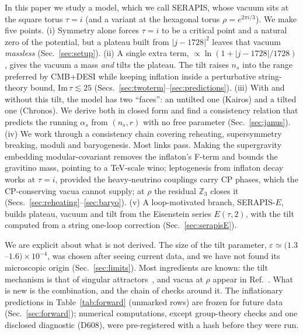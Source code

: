 \documentclass[aps,prd,twocolumn,superscriptaddress,nofootinbib,floatfix]{revtex4-2}
\begin{document}
In this paper we study a model, which we call SERAPIS, whose vacuum sits at the square torus $\tau = i$ (and a variant at the hexagonal torus $\rho = e^{2\pi i/3}$). We make five points.
(i) Symmetry alone forces $\tau = i$ to be a critical point and a natural zero of the potential, but a plateau built from $|j-1728|^2$ leaves that vacuum \emph{massless} (Sec.~\ref{sec:setup}).
(ii) A single extra term, $\propto \ln(1+|j-1728|/1728)$, gives the vacuum a mass \emph{and} tilts the plateau. The tilt raises $n_s$ into the range preferred by CMB+DESI while keeping inflation inside a perturbative string-theory bound, $\mathrm{Im}\,\tau \lesssim 25$ (Secs.~\ref{sec:twoterm}--\ref{sec:predictions}).
(iii) With and without this tilt, the model has two ``faces'': an untilted one (Kairos) and a tilted one (Chronos). We derive both in closed form and find a consistency relation that predicts the running $\alpha_s$ from $(n_s, r)$ with no free parameter (Sec.~\ref{sec:janus}).
(iv) We work through a consistency chain covering reheating, supersymmetry breaking, moduli and baryogenesis. Most links pass. Making the supergravity embedding modular-covariant removes the inflaton's F-term and bounds the gravitino mass, pointing to a TeV-scale wino; leptogenesis from inflaton decay works at $\tau=i$, provided the heavy-neutrino couplings carry CP phases, which the CP-conserving vacua cannot supply; at $\rho$ the residual $\mathbb{Z}_3$ closes it (Secs.~\ref{sec:reheating}--\ref{sec:baryo}).
(v) A loop-motivated branch, SERAPIS-$E$, builds plateau, vacuum and tilt from the Eisenstein series $E(\tau,2)$, with the tilt computed from a string one-loop correction (Sec.~\ref{sec:serapisE}).

We are explicit about what is not derived. The size of the tilt parameter, $\varepsilon \simeq (1.3$--$1.6)\times10^{-4}$, was chosen after seeing current data, and we have not found its microscopic origin (Sec.~\ref{sec:limits}). Most ingredients are known: the tilt mechanism is that of singular attractors~\cite{arXiv_2512_02969}, and vacua at $\rho$ appear in Ref.~\cite{arXiv_2408_05203}. What is new is the combination, and the chain of checks around it. The inflationary predictions in Table~\ref{tab:forward} (unmarked rows) are frozen for future data (Sec.~\ref{sec:forward}); numerical computations, except group-theory checks and one disclosed diagnostic (D608), were pre-registered with a hash before they were run.
\end{document}
